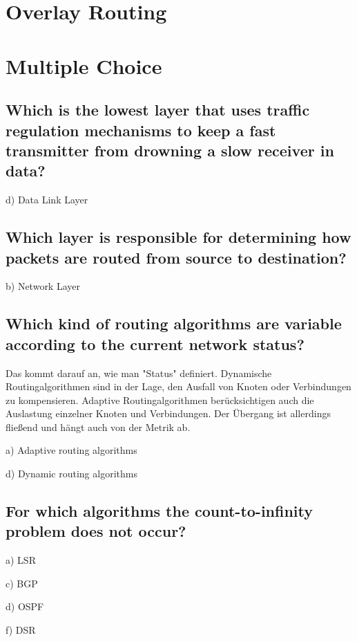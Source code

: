 \documentclass[a4paper,
			llpt,
			solution,
			accentcolor=tud2d,
			colorbacktitle
			]
			{tudexercise}
\newcommand{\8}{$\infty$}
\begin{document}
\section{Overlay Routing}
\section{Multiple Choice}
\subsection{Which is the lowest layer that uses traffic regulation mechanisms to keep a fast transmitter from drowning a slow receiver in data?}
\begin{compactenum}
\item[d)] Data Link Layer
\end{compactenum}
\subsection{Which layer is responsible for determining how packets are routed from source to destination?}
\begin{compactenum}
\item[b)] Network Layer
\end{compactenum}
\subsection{Which kind of routing algorithms are variable according to the current network status?}
Das kommt darauf an, wie man "Status" definiert. Dynamische Routingalgorithmen sind in der Lage, den Ausfall von Knoten oder Verbindungen zu kompensieren. Adaptive Routingalgorithmen berücksichtigen auch die Auslastung einzelner Knoten und Verbindungen. Der Übergang ist allerdings fließend und hängt auch von der Metrik ab.
\begin{compactenum}
\item[a)] Adaptive routing algorithms
\item[d)] Dynamic routing algorithms
\end{compactenum}
\subsection{For which algorithms the count-to-infinity problem does not occur?}
\begin{compactenum}
\item[a)] LSR
\item[c)] BGP
\item[d)] OSPF
\item[f)] DSR
\end{compactenum}
\end{document}
